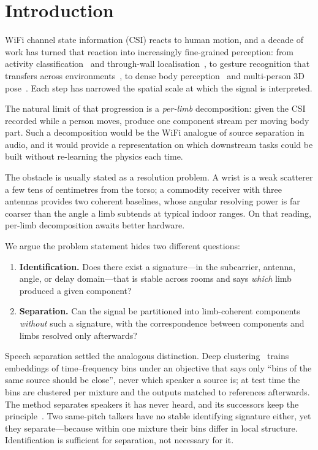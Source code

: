 \documentclass[conference]{IEEEtran}
\begin{document}
\section{Introduction}

WiFi channel state information (CSI) reacts to human motion, and a decade of
work has turned that reaction into increasingly fine-grained perception: from
activity classification~\cite{wang2015carm} and through-wall
localisation~\cite{adib2013seethrough}, to gesture recognition that transfers
across environments~\cite{zheng2019widar3}, to dense body
perception~\cite{wang2019personinwifi,geng2022densepose} and multi-person 3D
pose~\cite{yan2024personinwifi3d,perceptalign2026}. Each step has narrowed the
spatial scale at which the signal is interpreted.

The natural limit of that progression is a \emph{per-limb} decomposition: given
the CSI recorded while a person moves, produce one component stream per moving
body part. Such a decomposition would be the WiFi analogue of source separation
in audio, and it would provide a representation on which downstream tasks could
be built without re-learning the physics each time.

The obstacle is usually stated as a resolution problem. A wrist is a weak
scatterer a few tens of centimetres from the torso; a commodity receiver with
three antennas provides two coherent baselines, whose angular resolving power
is far coarser than the angle a limb subtends at typical indoor ranges. On that
reading, per-limb decomposition awaits better hardware.

We argue the problem statement hides two different questions:

\begin{enumerate}
\item \textbf{Identification.} Does there exist a signature---in the
subcarrier, antenna, angle, or delay domain---that is stable across rooms and
says \emph{which} limb produced a given component?
\item \textbf{Separation.} Can the signal be partitioned into limb-coherent
components \emph{without} such a signature, with the correspondence between
components and limbs resolved only afterwards?
\end{enumerate}

Speech separation settled the analogous distinction. Deep
clustering~\cite{hershey2016deep} trains embeddings of time--frequency bins
under an objective that says only ``bins of the same source should be close'',
never which speaker a source is; at test time the bins are clustered per
mixture and the outputs matched to references afterwards. The method separates
speakers it has never heard, and its successors keep the
principle~\cite{zeghidour2021wavesplit}. Two same-pitch talkers have no stable
identifying signature either, yet they separate---because within one mixture
their bins differ in local structure. Identification is sufficient for
separation, not necessary for it.
\end{document}

